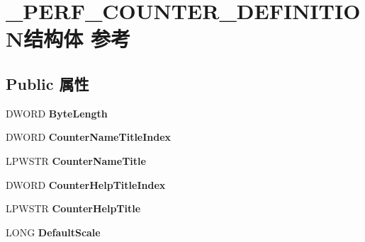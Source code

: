 \hypertarget{struct___p_e_r_f___c_o_u_n_t_e_r___d_e_f_i_n_i_t_i_o_n}{}\section{\+\_\+\+P\+E\+R\+F\+\_\+\+C\+O\+U\+N\+T\+E\+R\+\_\+\+D\+E\+F\+I\+N\+I\+T\+I\+O\+N结构体 参考}
\label{struct___p_e_r_f___c_o_u_n_t_e_r___d_e_f_i_n_i_t_i_o_n}
\subsection*{Public 属性}
\begin{DoxyCompactItemize}
\item 
\mbox{\label{struct___p_e_r_f___c_o_u_n_t_e_r___d_e_f_i_n_i_t_i_o_n_ab85e76f2d24aa762b03cfe8d3de3d166}} 
D\+W\+O\+RD {\bfseries Byte\+Length}
\item 
\mbox{\label{struct___p_e_r_f___c_o_u_n_t_e_r___d_e_f_i_n_i_t_i_o_n_a2f7c8df6bad083f86ce2bd82ad627a64}} 
D\+W\+O\+RD {\bfseries Counter\+Name\+Title\+Index}
\item 
\mbox{\label{struct___p_e_r_f___c_o_u_n_t_e_r___d_e_f_i_n_i_t_i_o_n_af1d17dda6d3b7cd8cf22229395b5937f}} 
L\+P\+W\+S\+TR {\bfseries Counter\+Name\+Title}
\item 
\mbox{\label{struct___p_e_r_f___c_o_u_n_t_e_r___d_e_f_i_n_i_t_i_o_n_abffa857ceb1a85fc76669b25300fab8e}} 
D\+W\+O\+RD {\bfseries Counter\+Help\+Title\+Index}
\item 
\mbox{\label{struct___p_e_r_f___c_o_u_n_t_e_r___d_e_f_i_n_i_t_i_o_n_a730cf91b70ec356c03c115bafbce97c3}} 
L\+P\+W\+S\+TR {\bfseries Counter\+Help\+Title}
\item 
\mbox{\label{struct___p_e_r_f___c_o_u_n_t_e_r___d_e_f_i_n_i_t_i_o_n_a88ec8ee6d125a0b3eeea0dfe5a9022a7}} 
L\+O\+NG {\bfseries Default\+Scale}

\end{DoxyCompactItemize}
